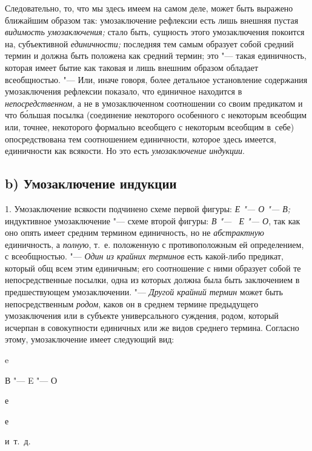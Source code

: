 Следовательно, то, что мы здесь имеем на самом деле, может
быть выражено ближайшим образом так: умозаключение рефлексии есть лишь
внешняя пустая {\em видимость
умозаключения;} стало быть, сущность этого умозаключения
покоится на, субъективной {\em единичности;}
последняя тем самым образует собой средний термин и должна
быть положена как средний термин; это "--- такая единичность,
которая имеет бытие как таковая и лишь внешним образом обладает
всеобщностью. "--- Или, иначе говоря, более детальное
установление содержания умозаключения рефлексии показало, что единичное
находится в {\em непосредственном},
а не в умозаключенном соотношении со своим предикатом и что
б\'{о}льшая посылка (соединение некоторого особенного с некоторым всеобщим или,
точнее, некоторого формально всеобщего с некоторым всеобщим в~себе)
опосредствована тем соотношением единичности, которое здесь имеется,
единичности как всякости. Но это есть {\em умозаключение индукции}.

\subsection[b) Умозаключение индукции]{b) Умозаключение индукции }

1. Умозаключение всякости подчинено схеме первой фигуры:
{\em Е "--- О "--- В;} индуктивное умозаключение "--- схеме второй
фигуры: {\em В "--- ~Е "--- О}, так как оно опять имеет средним термином
единичность, но не {\em абстрактную} единичность, а {\em полную}, т.~е.
положенную с противоположным ей определением,
с всеобщностью. "--- {\em Один из крайних терминов} есть какой-либо предикат,
который общ всем этим единичным; его соотношение с ними образует собой
те непосредственные посылки, одна из которых должна была быть заключением
в предшествующем умозаключении. "--- {\em Другой крайний термин}
может быть непосредственным {\em родом}, каков он в среднем термине
предыдущего умозаключения или в субъекте универсального
суждения, родом, который исчерпан в совокупности единичных или же видов
среднего термина. Согласно этому, умозаключение имеет следующий вид:

{\centering
e
\par}

{\centering
В "--- E "--- О
\par}

{\centering
е
\par}

{\centering
е
\par}

{\centering
и~т.~д.
\par}


